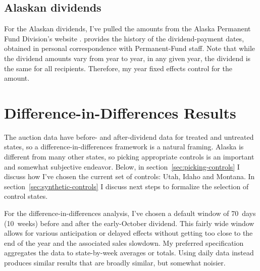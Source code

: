 \documentclass[11pt,letterpaper,oneside]{article}
\begin{document}
\begin{doublespacing}
\subsection{Alaskan dividends}

For the Alaskan dividends, I've pulled the amounts from the Alaska Permanent Fund Division's website \parencite{apfd_payments_summary}.
\textcite{hsieh2003} provides the history of the dividend\hyp{}payment dates, obtained in personal correspondence with Permanent\hyp{}Fund staff.
Note that while the dividend amounts vary from year to year, in any given year, the dividend is the same for all recipients.
Therefore, my year fixed effects control for the amount.


\section[DD Results]{Difference-in-Differences Results}

The auction data have before- and after\hyp{}dividend data for treated and untreated states, so a difference\hyp{}in\hyp{}differences framework is a natural framing.
Alaska is different from many other states, so picking appropriate controls is an important and somewhat subjective endeavor.
Below, in section~\ref{sec:picking-controls} I discuss how I've chosen the current set of controls: Utah, Idaho and Montana.
In section~\ref{sec:synthetic-controls} I discuss next steps to formalize the selection of control states.

For the difference\hyp{}in\hyp{}differences analysis, I've chosen a default window of 70~days (10~weeks) before and after the early\hyp{}October dividend.
This fairly wide window allows for various anticipation or delayed effects without getting too close to the end of the year and the associated sales slowdown.
My preferred specification aggregates the data to state\hyp{}by\hyp{}week averages or totals. Using daily data instead produces similar results that are broadly similar, but somewhat noisier.




\end{doublespacing}
\end{document}

